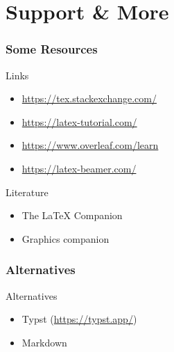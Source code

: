\section{Support \& More}
\begin{frame}
    \frametitle{Some Resources}
    \begin{block}{\blockstrut Links}
        \begin{itemize}
            \item \url{https://tex.stackexchange.com/}
            \item \url{https://latex-tutorial.com/}
            \item \url{https://www.overleaf.com/learn}
            \item \url{https://latex-beamer.com/}
        \end{itemize}
    \end{block}

    \begin{block}{\blockstrut Literature}
        \begin{itemize}
            \item The \LaTeX{} Companion
            \item Graphics companion
        \end{itemize}
    \end{block}
\end{frame}
\begin{frame}
    \frametitle{Alternatives}
    \begin{block}{\blockstrut Alternatives}
        \begin{itemize}
            \item Typst (\url{https://typst.app/})
            \item Markdown
        \end{itemize}
    \end{block}
\end{frame}